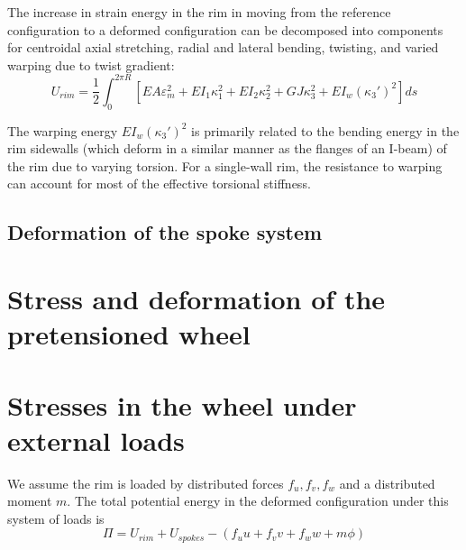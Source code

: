 \documentclass[\rootdir/thesis.tex]{subfiles}
\begin{document}
The increase in strain energy in the rim in moving from the reference configuration to a deformed configuration can be decomposed into components for centroidal axial stretching, radial and lateral bending, twisting, and varied warping due to twist gradient:
\begin{equation}
\label{eq:U_rim}
U_{rim} = \frac{1}{2} \int_0^{2\pi R}[EA\varepsilon_m^2 + EI_1\kappa_1^2+EI_2\kappa_2^2 + GJ\kappa_3^2 + EI_w(\kappa_3')^2]ds
\end{equation}

The warping energy $EI_w(\kappa_3')^2$ is primarily related to the bending energy in the rim sidewalls (which deform in a similar manner as the flanges of an I-beam) of the rim due to varying torsion. For a single-wall rim, the resistance to warping can account for most of the effective torsional stiffness.

\subsection{Deformation of the spoke system}




\section{Stress and deformation of the pretensioned wheel}




\section{Stresses in the wheel under external loads}

We assume the rim is loaded by distributed forces $f_u,f_v,f_w$ and a distributed moment $m$. The total potential energy in the deformed configuration under this system of loads is
\begin{equation}
\label{eq:TotPot}
\Pi = U_{rim} + U_{spokes} - (f_uu+f_vv+f_ww+m\phi)
\end{equation}
\end{document}
